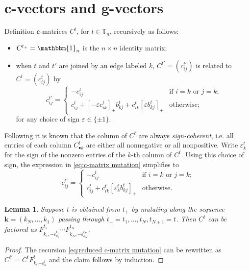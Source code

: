 \documentclass{amsart}
\newtheorem{lemma}[theorem]{Lemma}
\numberwithin{theorem}{section}
\newcommand{\bfc}{\boldsymbol{c}}
\newcommand{\bfg}{\boldsymbol{g}}
\newcommand{\bfk}{{\boldsymbol{k}}}
\newcommand{\TT}{\mathbb{T}}
\newcommand{\bOne}{\mathbbm{1}}
\begin{document}
  \section{$\bfc$-vectors and $\bfg$-vectors}

  Definition $\bfc$-matrices $C^t$, for $t\in\TT_n$, recursively as follows:
  \begin{itemize}
    \item $C^{t_+} = \bOne_n$ is the $n\times n$ identity matrix;
    \item when $t$ and $t'$ are joined by an edge labeled $k$, $C^{t'}=(c^{t'}_{ij})$ is related to $C^t=(c^t_{ij})$ by
      \begin{equation}
        \label{eq:c-matrix mutation}
        c^{t'}_{ij} = \begin{cases} -c^t_{ij} & \text{if $i=k$ or $j=k$;}\\ c^t_{ij} + [-\varepsilon c^t_{ik}]_+ b^t_{kj} + c^t_{ik} [\varepsilon b^t_{kj}]_+ & \text{otherwise;} \end{cases}
      \end{equation}
      for any choice of sign $\varepsilon\in\{\pm1\}$.
  \end{itemize}

  Following \cite{keller,ghkk} it is known that the column of $C^t$ are always \emph{sign-coherent}, i.e. all entries of each column $C^t_{\bullet k}$ are either all nonnegative or all nonpositive.
  Write $\varepsilon^t_k$ for the sign of the nonzero entries of the $k$-th column of $C^t$.
  Using this choice of sign, the expression in \eqref{eq:c-matrix mutation} simplifies to
  \begin{equation}
    \label{eq:reduced c-matrix mutation}
    c^{t'}_{ij} = \begin{cases} -c^t_{ij} & \text{if $i=k$ or $j=k$;}\\ c^t_{ij} + c^t_{ik} [\varepsilon^t_k b^t_{kj}]_+ & \text{otherwise.} \end{cases}
  \end{equation}

  \begin{lemma}
    \label{le:c-matrix factorization}
    Suppose $t$ is obtained from $t_+$ by mutating along the sequence $\bfk=(k_N,\ldots,k_1)$ passing through $t_+=t_1,\ldots,t_N,t_{N+1}=t$.
    Then $C^t$ can be factored as $F^{t_1}_{k_1,-\varepsilon^{t_1}_{k_1}}\cdots F^{t_N}_{k_N,-\varepsilon^{t_N}_{k_N}}$.
  \end{lemma}
  \begin{proof}
    The recursion \eqref{eq:reduced c-matrix mutation} can be rewritten as $C^{t'}=C^t F^t_{k,-\varepsilon^t_k}$ and the claim follows by induction.
  \end{proof}
\end{document}

